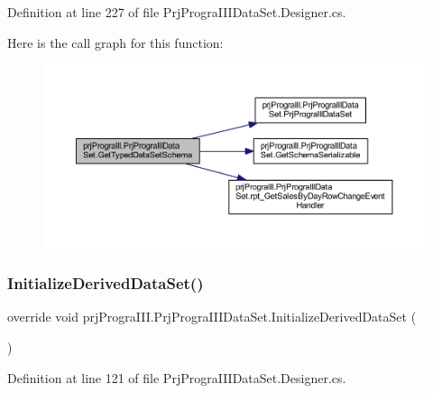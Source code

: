Definition at line 227 of file Prj\+Progra\+I\+I\+I\+Data\+Set.\+Designer.\+cs.

Here is the call graph for this function\+:
\nopagebreak
\begin{figure}[H]
\begin{center}
\leavevmode
\includegraphics[width=350pt]{classprj_progra_i_i_i_1_1_prj_progra_i_i_i_data_set_a52ad2b2277e8116e7216aed0b217b0c0_cgraph}
\end{center}
\end{figure}
\hypertarget{classprj_progra_i_i_i_1_1_prj_progra_i_i_i_data_set_aa8541b1f58ec4d21af6ae9e40bad3646}{}\label{classprj_progra_i_i_i_1_1_prj_progra_i_i_i_data_set_aa8541b1f58ec4d21af6ae9e40bad3646} 
\subsubsection{\texorpdfstring{Initialize\+Derived\+Data\+Set()}{InitializeDerivedDataSet()}}
{\footnotesize\ttfamily override void prj\+Progra\+I\+I\+I.\+Prj\+Progra\+I\+I\+I\+Data\+Set.\+Initialize\+Derived\+Data\+Set (\begin{DoxyParamCaption}{ }\end{DoxyParamCaption})\hspace{0.3cm}{\ttfamily [protected]}}



Definition at line 121 of file Prj\+Progra\+I\+I\+I\+Data\+Set.\+Designer.\+cs.

\hypertarget{classprj_progra_i_i_i_1_1_prj_progra_i_i_i_data_set_a21a8550e3e06446282a9f8aa1511f3ad}{}\label{classprj_progra_i_i_i_1_1_prj_progra_i_i_i_data_set_a21a8550e3e06446282a9f8aa1511f3ad} 
